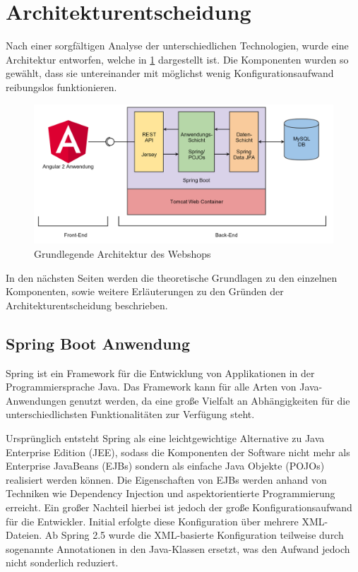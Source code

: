 \section{Architekturentscheidung}\label{arch_decission} \thispagestyle{nomarkstyle}
Nach einer sorgfältigen Analyse der unterschiedlichen Technologien, wurde eine Architektur entworfen, welche in \cref{fig:webshop_arch} dargestellt ist. Die Komponenten wurden so gewählt, dass sie untereinander mit möglichst wenig Konfigurationsaufwand reibungslos funktionieren. 

\begin{figure}[th!]
	\centering
	\includegraphics[width=\linewidth]{bilder/kap5/webshop_arch.png}
	\caption{Grundlegende Architektur des Webshops}
	\label{fig:webshop_arch}
\end{figure}

In den nächsten Seiten werden die theoretische Grundlagen zu den einzelnen Komponenten, sowie weitere Erläuterungen zu den Gründen der Architekturentscheidung beschrieben. 

\subsection{Spring Boot Anwendung}
Spring ist ein Framework für die Entwicklung von Applikationen in der Programmiersprache Java. Das Framework kann für alle Arten von Java-Anwendungen genutzt werden, da eine große Vielfalt an Abhängigkeiten für die unterschiedlichsten Funktionalitäten zur Verfügung steht.

Ursprünglich entsteht Spring als eine leichtgewichtige Alternative zu Java Enterprise Edition (\acs{JEE}), sodass die Komponenten der Software nicht mehr als Enterprise JavaBeans (\acs{EJB}s) sondern als einfache Java Objekte (\acs{POJO}s) realisiert werden können. Die Eigenschaften von \acs{EJB}s werden anhand von Techniken wie Dependency Injection und aspektorientierte Programmierung erreicht. Ein großer Nachteil hierbei ist jedoch der große Konfigurationsaufwand für die Entwickler. Initial erfolgte diese Konfiguration über mehrere \acs{XML}-Dateien. Ab Spring 2.5 wurde die \acs{XML}-basierte Konfiguration teilweise durch sogenannte Annotationen in den Java-Klassen ersetzt, was den Aufwand jedoch nicht sonderlich reduziert\cite{Walls2015}.

